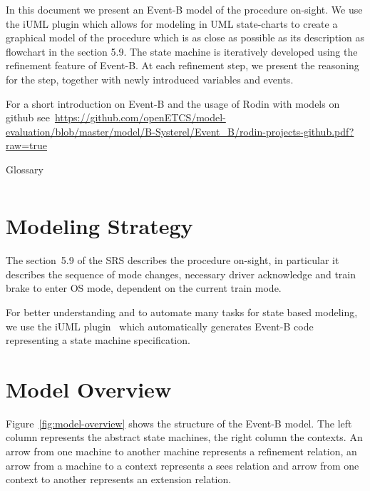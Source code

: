 \documentclass{template/openetcs_article}
\begin{document}
In this document we present an Event-B model of the procedure on-sight. We use
the iUML plugin which allows for modeling in UML state-charts to create a
graphical model of the procedure which is as close as possible as its
description as flowchart in the section 5.9. The state machine is iteratively
developed using the refinement feature of Event-B. At each refinement step, we
present the reasoning for the step, together with newly introduced variables and
events.

For a short introduction on Event-B and the usage of Rodin with models on github
see~\url{https://github.com/openETCS/model-evaluation/blob/master/model/B-Systerel/Event_B/rodin-projects-github.pdf?raw=true}

\begin{table}[ht]
  \centering
  \begin{tabular}[ht]{|l|l|}
    \hline
    \hline
  \end{tabular}
  \caption{Glossary}
  \label{tab:glossary}
\end{table}

\section{Modeling Strategy}
\label{sec:modeling-strategy}

The section~5.9 of the SRS describes the procedure on-sight, in particular it
describes the sequence of mode changes, necessary driver acknowledge and train
brake to enter OS mode, dependent on the current train mode.

For better understanding and to automate many tasks for state based modeling, we
use the iUML plugin~\cite{UML-plugin} which automatically generates Event-B code
representing a state machine specification.

\section{Model Overview}
\label{sec:model-overview}

Figure~\ref{fig:model-overview} shows the structure of the Event-B model. The
left column represents the abstract state machines, the right column the
contexts. An arrow from one machine to another machine represents a refinement
relation, an arrow from a machine to a context represents a sees relation and
arrow from one context to another represents an extension relation.
\end{document}
